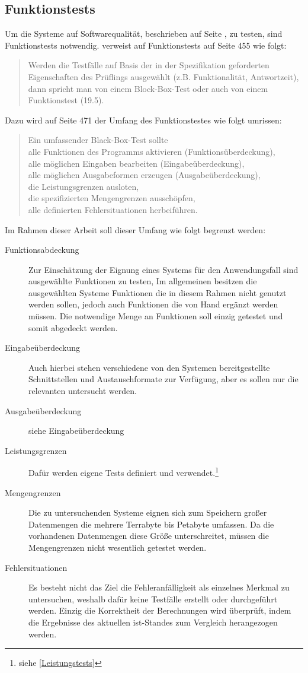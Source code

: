 \subsection{Funktionstests}
Um die Systeme auf Softwarequalität, beschrieben auf Seite \pageref{softwarequalität}, zu testen, sind Funktionstests notwendig.
\cite{book:softwareengineering} verweist auf Funktionstests auf Seite 455 wie folgt:
\begin{quote}
Werden die Testfälle auf Basis der in der Spezifikation geforderten Eigenschaften des Prüflings ausgewählt (z.B. Funktionalität, Antwortzeit), dann spricht man von einem Block-Box-Test oder auch von einem Funktionstest (19.5).
\end{quote}
Dazu wird auf Seite 471 der Umfang des Funktionstestes wie folgt umrissen:
\begin{quote}
Ein umfassender Black-Box-Test sollte\\
alle Funktionen des Programms aktivieren (Funktionsüberdeckung),\\
alle möglichen Eingaben bearbeiten (Eingabeüberdeckung),\\
alle möglichen Ausgabeformen erzeugen (Ausgabeüberdeckung),\\
die Leistungsgrenzen ausloten,\\
die spezifizierten Mengengrenzen ausschöpfen,\\
alle definierten Fehlersituationen herbeiführen.
\end{quote}
Im Rahmen dieser Arbeit soll dieser Umfang wie folgt begrenzt werden:
\begin{description}
\item[Funktionsabdeckung] Zur Einschätzung der Eignung eines Systems für den Anwendungsfall sind ausgewählte Funktionen zu testen, Im allgemeinen besitzen die ausgewählten Systeme Funktionen die in diesem Rahmen nicht genutzt werden sollen, jedoch auch Funktionen die von Hand ergänzt werden müssen. Die notwendige Menge an Funktionen soll einzig getestet und somit abgedeckt werden.
\item[Eingabeüberdeckung] Auch hierbei stehen verschiedene von den Systemen bereitgestellte Schnittstellen und Austauschformate zur Verfügung, aber es sollen nur die relevanten untersucht werden.
\item[Ausgabeüberdeckung] siehe Eingabeüberdeckung
\item[Leistungsgrenzen] Dafür werden eigene Tests definiert und verwendet.\footnote{siehe \ref{Leistungstests}}
\item[Mengengrenzen] Die zu untersuchenden Systeme eignen sich zum Speichern großer Datenmengen die mehrere Terrabyte bis Petabyte umfassen. Da die vorhandenen Datenmengen diese Größe unterschreitet, müssen die Mengengrenzen nicht wesentlich getestet werden.
\item[Fehlersituationen] Es besteht nicht das Ziel die Fehleranfälligkeit als einzelnes Merkmal zu untersuchen, weshalb dafür keine Testfälle erstellt oder durchgeführt werden. Einzig die Korrektheit der Berechnungen wird überprüft, indem die Ergebnisse des aktuellen ist-Standes zum Vergleich herangezogen werden. 
\end{description}

